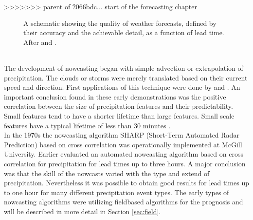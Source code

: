 \documentclass[11pt,twoside,a4paper,fleqn,x11names]{report}
\numberwithin{equation}{chapter}
\numberwithin{figure}{chapter}
\numberwithin{table}{chapter}
\begin{document}
>>>>>>> parent of 2066bdc... start of the forecasting chapter
\begin{figure}[!htbp]
	\centering
	\caption{A schematic showing the quality of weather forecasts, defined by their accuracy and the achievable detail, as a function of lead time. After \cite{Pierce12} and \cite{Browning1980}.}
	\label{fig:prognosisquality}
\end{figure}\\
The development of nowcasting began with simple advection or extrapolation of precipitation. The clouds or storms were merely translated based on their current speed and direction. First applications of this technique were done by \cite{hilst1960} and \cite{Noel}. An important conclusion found in these early demonstrations was the positive correlation between the size of precipitation features and their predictability. Small features tend to have a shorter lifetime than large features. Small scale features have a typical lifetime of less than 30 minutes \citep{Sene2009}.\\
In the 1970s the nowcasting algorithm SHARP (Short-Term Automated Radar Prediction) based on cross correlation was operationally implemented at McGill University. Earlier \cite{Austin1974} evaluated an automated nowcasting algorithm based on cross correlation for precipitation for lead times up to three hours. A major conclusion was that the skill of the nowcasts varied with the type and extend of precipitation. Nevertheless it was possible to obtain good results for lead times up to one hour for many different precipitation event types. The early types of nowcasting algorithms were utilizing fieldbased algorithms for the prognosis and will be described in more detail in Section \ref{sec:field}. \\
\end{document}
